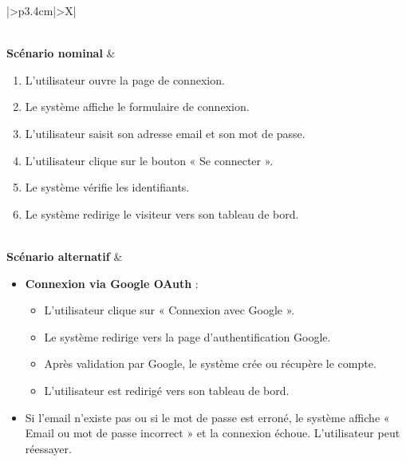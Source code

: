 ﻿\documentclass[a4paper,12pt]{report}
\begin{document}
\begin{table}[H]
\begin{tabularx}{\textwidth}{|>{\RaggedRight\arraybackslash}p{3.4cm}|>{\RaggedRight\arraybackslash}X|}
\begin{minipage}[t]{\linewidth}
\begin{itemize}[leftmargin=*, topsep=0pt, itemsep=1pt]
\end{itemize}
\vspace{2pt}
\end{minipage} \\
\hline
\textbf{Scénario nominal} &
\begin{minipage}[t]{\linewidth}
\vspace{2pt}
\begin{enumerate}[label=\arabic*., leftmargin=*, topsep=0pt, itemsep=1pt]
    \item L'utilisateur ouvre la page de connexion.
    \item Le système affiche le formulaire de connexion.
    \item L'utilisateur saisit son adresse email et son mot de passe. 
    \item L'utilisateur clique sur le bouton « Se connecter ».
    \item Le système vérifie les identifiants.
    \item Le système redirige le visiteur vers son tableau de bord.
\end{enumerate}
\vspace{2pt}
\end{minipage} \\
\hline
\textbf{Scénario alternatif} &
\begin{minipage}[t]{\linewidth}
\vspace{2pt}
\begin{itemize}[leftmargin=*, topsep=0pt, itemsep=1pt]
    \item \textbf{Connexion via Google OAuth} :
    \begin{itemize}[leftmargin=*, topsep=1pt, itemsep=1pt]
        \item L'utilisateur clique sur « Connexion avec Google ».
        \item Le système redirige vers la page d'authentification Google.
        \item Après validation par Google, le système crée ou récupère le compte.
        \item L'utilisateur est redirigé vers son tableau de bord.
    \end{itemize}
    \item  Si l'email n'existe pas ou si le mot de passe est erroné, le système affiche « Email ou mot de passe incorrect » et la connexion échoue. L'utilisateur peut réessayer.
\end{itemize}
\vspace{2pt}
\end{minipage} \\
\hline
\end{tabularx}
\end{table}
\end{document}
